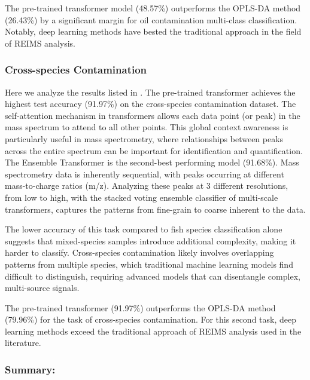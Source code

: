 The pre-trained transformer model (48.57\%) outperforms the OPLS-DA method (26.43\%) by a significant margin for oil contamination multi-class classification. Notably, deep learning methods have bested the traditional approach in the field of REIMS analysis. 

\subsubsection{Cross-species Contamination}

Here we analyze the results listed in .
The pre-trained transformer achieves the highest test accuracy (91.97\%) on the cross-species contamination dataset. The self-attention mechanism in transformers allows each data point (or peak) in the mass spectrum to attend to all other points. This global context awareness is particularly useful in mass spectrometry, where relationships between peaks across the entire spectrum can be important for identification and quantification.
The Ensemble Transformer is the second-best performing model (91.68\%). Mass spectrometry data is inherently sequential, with peaks occurring at different mass-to-charge ratios (m/z). Analyzing these peaks at 3 different resolutions, from low to high, with the stacked voting ensemble classifier of multi-scale transformers, captures the patterns from fine-grain to coarse inherent to the data.

The lower accuracy of this task compared to fish species classification alone \citep{Wood2022} suggests that mixed-species samples introduce additional complexity, making it harder to classify. Cross-species contamination likely involves overlapping patterns from multiple species, which traditional machine learning models find difficult to distinguish, requiring advanced models that can disentangle complex, multi-source signals.

The pre-trained transformer (91.97\%) outperforms the OPLS-DA method (79.96\%) for the task of cross-species contamination. For this second task, deep learning methods exceed the traditional approach of REIMS analysis used in the literature.

\subsubsection{Summary:}

